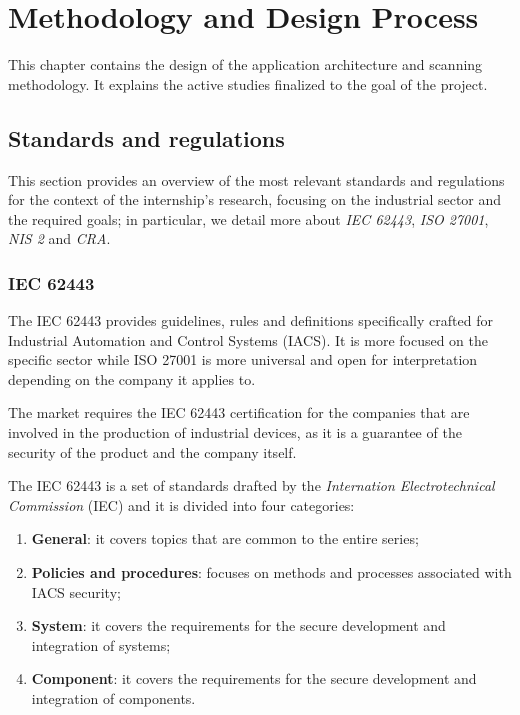 \chapter{Methodology and Design Process}

This chapter contains the design of the application architecture and scanning methodology. It explains the active studies finalized to the goal of the project.

\section{Standards and regulations}

This section provides an overview of the most relevant standards and regulations for the context of the internship's research, focusing on the industrial sector and the required goals; in particular, we detail more about \textit{IEC 62443}, \textit{ISO 27001}, \textit{NIS 2} and \textit{CRA}.

\subsection{IEC 62443}
\label{sec:iec-62443}

The IEC 62443 provides guidelines, rules and definitions specifically crafted for Industrial Automation and Control Systems (IACS). It is more focused on the specific sector while ISO 27001 is more universal and open for interpretation depending on the company it applies to.

The market requires the IEC 62443 certification for the companies that are involved in the production of industrial devices, as it is a guarantee of the security of the product and the company itself.

The IEC 62443 is a set of standards drafted by the \textit{Internation Electrotechnical Commission} (IEC) and it is divided into four categories:~\cite{iec-62443-parts-understanding}
\begin{enumerate}
  \item \textbf{General}: it covers topics that are common to the entire series;
  \item \textbf{Policies and procedures}: focuses on methods and processes associated with IACS security;
  \item \textbf{System}: it covers the requirements for the secure development and integration of systems;
  \item \textbf{Component}: it covers the requirements for the secure development and integration of components.
\end{enumerate}

